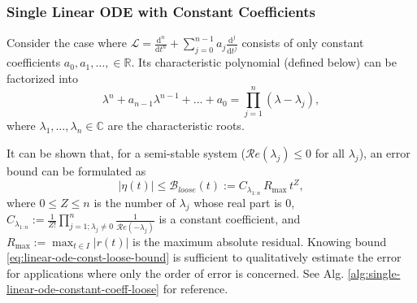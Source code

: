 \documentclass[accepted]{uai2023}
\newcommand{\Err}{\eta}
\newcommand{\Bound}{\mathcal{B}}
\renewcommand{\L}{\mathcal{L}}
\renewcommand{\Re}[1]{\mathcal{R}e\left(#1\right)}
\begin{document}
\subsubsection{Single Linear ODE with Constant Coefficients}\label{section:single-linear-ode-with-constant-coefficients}
    Consider the case where $\L = \frac{\mathrm{d}^n}{\mathrm{d}t^n} + \sum_{j=0}^{n - 1} a_j \frac{\mathrm{d}^j}{\mathrm{d}t^j}$ consists of only constant coefficients $a_0, a_1, \dots, \in \mathbb{R}$.
    Its characteristic polynomial (defined below) can be factorized into
    {
        \small
        \begin{equation} \label{eq:single-linear-ode-characteristic-polynomial-factorization}
            \lambda^n + a_{n-1}\lambda^{n-1} + \dots + a_0 = \prod_{j=1}^{n}(\lambda - \lambda_j),
        \end{equation}
    }
    where $\lambda_1, \dots, \lambda_n \in \mathbb{C}$ are the characteristic roots. 

    It can be shown that, for a semi-stable system ($\Re{\lambda_j} \leq 0$ for all $\lambda_j$), an error bound can be formulated as
    \begin{equation} \label{eq:linear-ode-const-loose-bound}
        \left|\Err(t)\right| \leq \Bound_{loose}(t) := C_{\lambda_{1:n}}\, R_{\max}\, t^{Z},
    \end{equation}
    where $0\leq Z \leq n$ is the number of $\lambda_j$ whose real part is $0$, $C_{\lambda_{1:n}} := \frac{1}{Z!}\prod_{j=1; \lambda_j\neq 0}^{n} \frac{1}{\Re{-\lambda_j}}$ is a constant coefficient, and $R_{\max}:=\max_{t\in I} |r(t)|$ is the maximum absolute residual. 
    Knowing bound \ref{eq:linear-ode-const-loose-bound} is sufficient to qualitatively estimate the error for applications where only the order of error is concerned. See Alg. \ref{alg:single-linear-ode-constant-coeff-loose} for reference.
\end{document}
